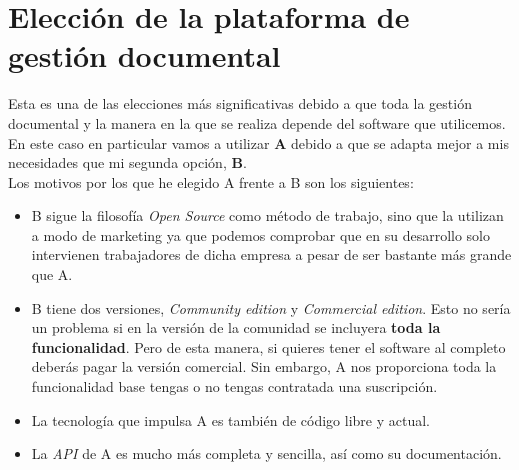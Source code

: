 \chapter{Elección de la plataforma de gestión documental}

Esta es una de las elecciones más significativas debido a que toda la gestión documental
y la manera en la que se realiza depende del software que utilicemos.
\\

En este caso en particular vamos a utilizar \textbf{A} debido a que se adapta mejor a mis
necesidades que mi segunda opción, \textbf{B}.
\\

Los motivos por los que he elegido A frente a B son los siguientes:

\begin{itemize}
	\item B sigue la filosofía \textit{Open Source} como método de trabajo, sino que la utilizan a modo de marketing
	 			ya que podemos comprobar que en su desarrollo solo intervienen trabajadores de dicha empresa a pesar de ser bastante
				más grande que A.
	\item B tiene dos versiones, \textit{Community edition} y \textit{Commercial edition}. Esto no sería un problema
				si en la versión de la comunidad se incluyera \textbf{toda la funcionalidad}. Pero de esta manera, si quieres tener
				el software al completo deberás pagar la versión comercial. Sin embargo, A nos proporciona toda la funcionalidad
				base tengas o no tengas contratada una suscripción.
	\item La tecnología que impulsa A es también de código libre y actual.
	\item La \textit{API} de A es mucho más completa y sencilla, así como su documentación.
\end{itemize}
